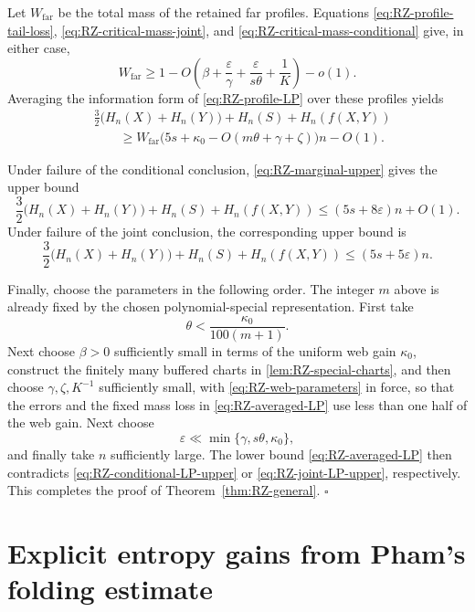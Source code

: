 \documentclass[11pt]{article}
\begin{document}
Let \(W_{\mathrm{far}}\) be the total mass of the retained far
profiles.  Equations \eqref{eq:RZ-profile-tail-loss},
\eqref{eq:RZ-critical-mass-joint}, and
\eqref{eq:RZ-critical-mass-conditional} give, in either case,
\begin{equation}
 W_{\mathrm{far}}
 \ge1-O\!\left(\beta+\frac{\varepsilon}{\gamma}
 +\frac{\varepsilon}{s\theta}+\frac{1}{K}\right)-o(1).
 \label{eq:RZ-far-mass}
\end{equation}
Averaging the information form of \eqref{eq:RZ-profile-LP} over
these profiles yields
\begin{align}
 &\frac{3}{2}\bigl(H_n(X)+H_n(Y)\bigr)
   +H_n(S)+H_n(f(X,Y))
 \nonumber\\
 &\qquad\ge
 W_{\mathrm{far}}
 \bigl(5s+\kappa_0
       -O(m\theta+\gamma+\zeta)\bigr)n-O(1).
 \label{eq:RZ-averaged-LP}
\end{align}

Under failure of the conditional conclusion,
\eqref{eq:RZ-marginal-upper} gives the upper bound
\begin{equation}
 \frac{3}{2}\bigl(H_n(X)+H_n(Y)\bigr)
 +H_n(S)+H_n(f(X,Y))
 \le(5s+8\varepsilon)n+O(1).
 \label{eq:RZ-conditional-LP-upper}
\end{equation}
Under failure of the joint conclusion, the corresponding upper bound
is
\begin{equation}
 \frac{3}{2}\bigl(H_n(X)+H_n(Y)\bigr)
 +H_n(S)+H_n(f(X,Y))
 \le(5s+5\varepsilon)n.
 \label{eq:RZ-joint-LP-upper}
\end{equation}

Finally, choose the parameters in the following order.  The integer
\(m\) above is already fixed by the chosen polynomial-special
representation.  First take
\[
 \theta<\frac{\kappa_0}{100(m+1)}.
\]
Next choose \(\beta>0\) sufficiently small in terms of the uniform
web gain \(\kappa_0\), construct the finitely many buffered charts in
\cref{lem:RZ-special-charts}, and then choose
\(\gamma,\zeta,K^{-1}\) sufficiently small, with
\eqref{eq:RZ-web-parameters} in force, so that the errors and the
fixed mass loss in \eqref{eq:RZ-averaged-LP} use less than one half
of the web gain.  Next choose
\[
 \varepsilon\ll\min\{\gamma,s\theta,\kappa_0\},
\]
and finally take \(n\) sufficiently large.  The lower bound
\eqref{eq:RZ-averaged-LP} then contradicts
\eqref{eq:RZ-conditional-LP-upper} or
\eqref{eq:RZ-joint-LP-upper}, respectively.  This completes the proof
of Theorem~\ref{thm:RZ-general}. \hfill\(\square\)
\section{Explicit entropy gains from Pham's folding estimate}
\label{sec:Pham-explicit}
\end{document}
